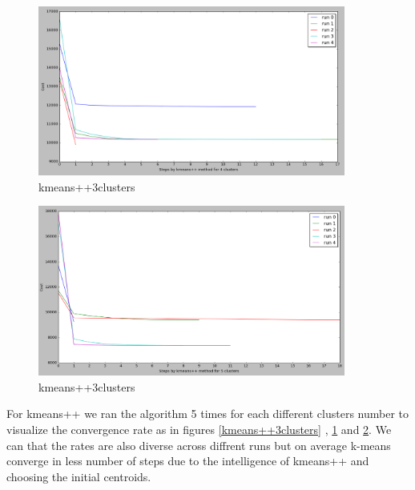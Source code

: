 \begin{figure}[!htb]
\centering
\includegraphics[width=0.9\textwidth]{shots/kmeans++4clusters.png}
\caption{kmeans++3clusters }
\label{kmeans++4clusters}
\end{figure}


\begin{figure}[!htb]
\centering
\includegraphics[width=0.9\textwidth]{shots/kmeans++5clusters.png}
\caption{ kmeans++3clusters}
\label{kmeans++5clusters}
\end{figure}
  

For kmeans++ we ran the algorithm 5 times for each different clusters number to visualize the convergence rate as in figures \ref{kmeans++3clusters} , \ref{kmeans++4clusters} and \ref{kmeans++5clusters}. We can that the rates are also diverse across diffrent runs but on average k-means converge in less number of steps due to the intelligence of kmeans++ and choosing the initial centroids. 










